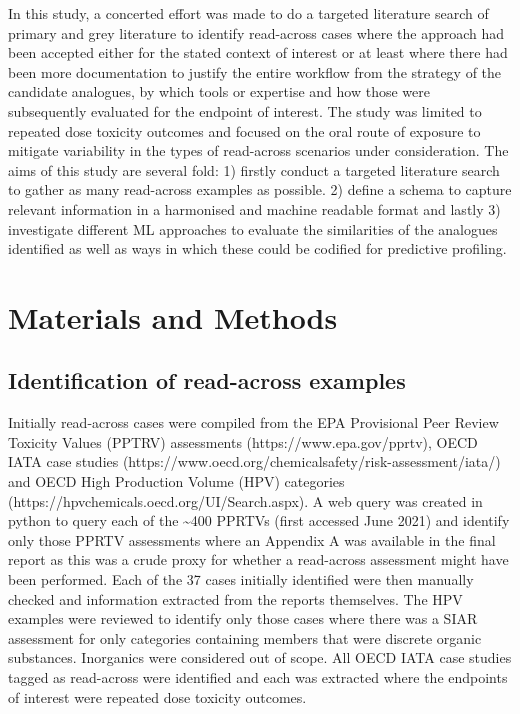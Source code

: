 \documentclass[
  super,
  preprint,
  3p]{elsarticle}
\begin{document}
In this study, a concerted effort was made to do a targeted literature
search of primary and grey literature to identify read-across cases
where the approach had been accepted either for the stated context of
interest or at least where there had been more documentation to justify
the entire workflow from the strategy of the candidate analogues, by
which tools or expertise and how those were subsequently evaluated for
the endpoint of interest. The study was limited to repeated dose
toxicity outcomes and focused on the oral route of exposure to mitigate
variability in the types of read-across scenarios under consideration.
The aims of this study are several fold: 1) firstly conduct a targeted
literature search to gather as many read-across examples as possible. 2)
define a schema to capture relevant information in a harmonised and
machine readable format and lastly 3) investigate different ML
approaches to evaluate the similarities of the analogues identified as
well as ways in which these could be codified for predictive profiling.

\section{Materials and Methods}\label{materials-and-methods}

\subsection{Identification of read-across
examples}\label{identification-of-read-across-examples}

Initially read-across cases were compiled from the EPA Provisional Peer
Review Toxicity Values (PPTRV) assessments (https://www.epa.gov/pprtv),
OECD IATA case studies
(https://www.oecd.org/chemicalsafety/risk-assessment/iata/) and OECD
High Production Volume (HPV) categories
(https://hpvchemicals.oecd.org/UI/Search.aspx). A web query was created
in python to query each of the \textasciitilde400 PPRTVs (first accessed
June 2021) and identify only those PPRTV assessments where an Appendix A
was available in the final report as this was a crude proxy for whether
a read-across assessment might have been performed. Each of the 37 cases
initially identified were then manually checked and information
extracted from the reports themselves. The HPV examples were reviewed to
identify only those cases where there was a SIAR assessment for only
categories containing members that were discrete organic substances.
Inorganics were considered out of scope. All OECD IATA case studies
tagged as read-across were identified and each was extracted where the
endpoints of interest were repeated dose toxicity outcomes.
\end{document}
